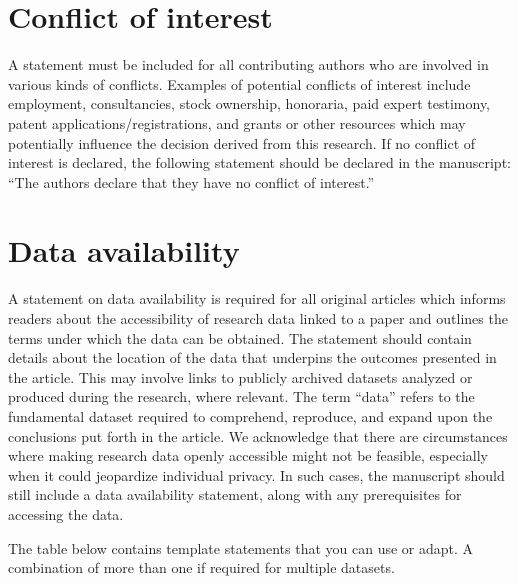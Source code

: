 \documentclass[12pt,a4paper]{article}
\begin{document}
\section{Conflict of interest}

A statement must be included for all contributing authors who are involved in various kinds of conflicts. Examples of potential conflicts of interest include employment, consultancies, stock ownership, honoraria, paid expert testimony, patent applications/registrations, and grants or other resources which may potentially influence the decision derived from this research. If no conflict of interest is declared, the following statement should be declared in the manuscript: ``The authors declare that they have no conflict of interest.''

\section{Data availability}

A statement on data availability is required for all original articles which informs readers about the accessibility of research data linked to a paper and outlines the terms under which the data can be obtained. The statement should contain details about the location of the data that underpins the outcomes presented in the article. This may involve links to publicly archived datasets analyzed or produced during the research, where relevant. The term ``data'' refers to the fundamental dataset required to comprehend, reproduce, and expand upon the conclusions put forth in the article. We acknowledge that there are circumstances where making research data openly accessible might not be feasible, especially when it could jeopardize individual privacy. In such cases, the manuscript should still include a data availability statement, along with any prerequisites for accessing the data.

The table below contains template statements that you can use or adapt. A combination of more than one if required for multiple datasets.

\vspace{1em}
\end{document}

